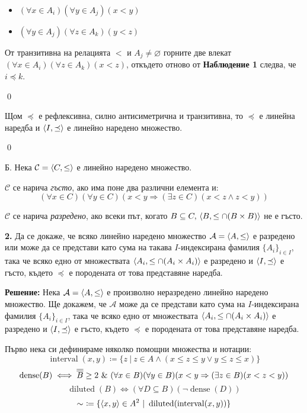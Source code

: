 \begin{problem}
\begin{tcolorbox}[mybox, title={Доказателство:}]
\begin{itemize}
\item
$(\forall x \in A_i)(\forall y \in A_j)(x < y)$
\item
$(\forall y \in A_j)(\forall z \in A_k)(y < z)$
\end{itemize}

\quad
От транзитивна на релацията $<$ и $A_j \neq \varnothing$ горните две влекат
$(\forall x \in A_i)(\forall z \in A_k)(x < z)$,
откъдето отново от \textbf{Наблюдение 1} следва, че $i \preceq k$.

\qed
\end{tcolorbox}

\quad
Щом $\preceq$ е рефлексивна, силно антисиметрична и транзитивна, то $\preceq$ е линейна наредба
и $\langle I, \preceq \rangle$ е линейно наредено множество.

\qed

\quad
Б. Нека $\mathcal{C} = \langle C, \leq \rangle$ е линейно наредено множество.

\quad
$\mathcal{C}$ се нарича \textit{гъсто}, ако има поне два различни елемента и:
\[
(\forall x \in C)(\forall y \in C)(x < y \Rightarrow (\exists z \in C)(x < z \land z < y))
\]

\quad
$\mathcal{C}$ се нарича \textit{разредено}, ако всеки път,
когато $B \subseteq C,\, \langle B, \leq \cap (B \times B) \rangle$ не е гъсто.

\quad
\textbf{2.} Да се докаже, че всяко линейно наредено множество $\mathcal{A} = \langle A, \leq \rangle$ е
разредено или може да се представи като сума на такава $I$-индексирана
фамилия $\{A_i\}_{i \in I}$, така че всяко едно от множествата $\langle A_i, \leq \cap (A_i \times A_i) \rangle$
е разредено и $\langle I, \preceq \rangle$ е гъсто, където $\preceq$ е породената от това представяне наредба.

\bigbreak
\textbf{Решение:}
\smallbreak
\quad
Нека $\mathcal{A} = \langle A, \le \rangle$ е произволно неразредено линейно наредено множество.
Ще докажем, че $\mathcal{A}$ може да се представи като сума на $I$-индексирана фамилия $\{A_i\}_{i \in I}$,
така че всяко едно от множествата $\langle A_i, \leq \cap (A_i \times A_i) \rangle$
е разредено и $\langle I, \preceq \rangle$ е гъсто, където $\preceq$ е породената от това представяне наредба.

Първо нека си дефинираме няколко помощни множества и нотации:
\[
\operatorname{interval}(x, y) \coloneq \{z\ |\ z \in A \land (x \le z \le y \lor y \le z \le x)\}
\]
\[
\operatorname{dense}(B) \iff \overline{\overline{B}} \ge 2 \ \&\  (\forall x \in B)(\forall y \in B)(x < y \Rightarrow (\exists z \in B)(x < z < y))
\]
\[
\operatorname{diluted}(B) \iff (\forall D \subseteq B)(\neg \operatorname{dense}(D))
\]
\[
\sim\ \coloneq \{\pair{x, y} \in A^2\ |\ \operatorname{diluted}(\operatorname{interval}(x, y))\}
\]


\end{problem}
